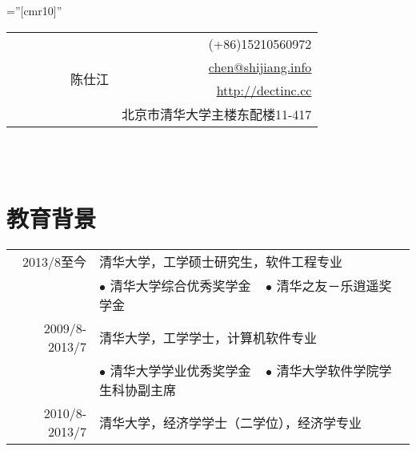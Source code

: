\documentclass[a4paper,10pt]{professional-cv-cn}
\begin{document}

\pagestyle{empty} %

\font\fb=''[cmr10]'' %

\begin{tabular}{lr}
\multirow{4}{24em}{\Huge ~~~~~~~~~陈仕江}
    & (+86)15210560972 \\
    & \href{mailto:chen@shijiang.info}{chen@shijiang.info} \\
    & \href{http://dectinc.cc}{http://dectinc.cc} \\
    & 北京市清华大学主楼东配楼11-417 
\end{tabular}
\\
\\



\section{教育背景}
\begin{tabular}{rl} 
 \textsc{2013/8至今} & 清华大学，工学硕士研究生，软件工程专业 \\
 & \small{$\bullet$ 清华大学综合优秀奖学金 ~ $\bullet$ 清华之友－乐逍遥奖学金} \\
 \textsc{2009/8-2013/7} & 清华大学，工学学士，计算机软件专业 \\
 & \small{$\bullet$ 清华大学学业优秀奖学金 ~ $\bullet$ 清华大学软件学院学生科协副主席} \\
 \textsc{2010/8-2013/7} & 清华大学，经济学学士（二学位），经济学专业
\end{tabular}
\end{document}
